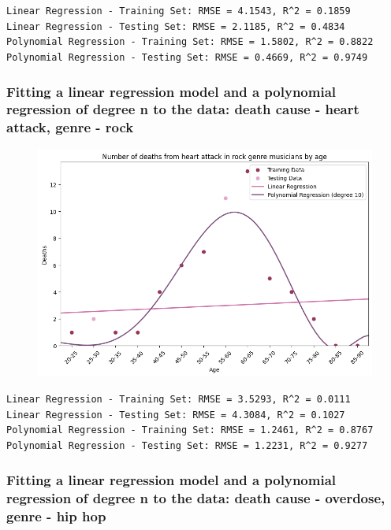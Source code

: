 \documentclass{article}
\begin{document}
\noindent\texttt{Linear Regression - Training Set: RMSE = 4.1543, R\textasciicircum2 = 0.1859\\
Linear Regression - Testing Set: RMSE = 2.1185, R\textasciicircum2 = 0.4834\\
Polynomial Regression - Training Set: RMSE = 1.5802, R\textasciicircum2 = 0.8822\\
Polynomial Regression - Testing Set: RMSE = 0.4669, R\textasciicircum2 = 0.9749\\}



\subsubsection{Fitting a linear regression model and a polynomial regression of degree n to the data: death cause - heart attack, genre - rock}

\begin{figure} [H]
    \centering
    \includegraphics[width=0.6\linewidth]{graph_images/experiments/exp2.png}
    \label{fig:enter-label}
\end{figure}

\noindent\texttt{Linear Regression - Training Set: RMSE = 3.5293, R\textasciicircum2 = 0.0111\\
Linear Regression - Testing Set: RMSE = 4.3084, R\textasciicircum2 = 0.1027\\
Polynomial Regression - Training Set: RMSE = 1.2461, R\textasciicircum2 = 0.8767\\
Polynomial Regression - Testing Set: RMSE = 1.2231, R\textasciicircum2 = 0.9277\\}



\subsubsection{Fitting a linear regression model and a polynomial regression of degree n to the data: death cause - overdose, genre - hip hop}
\end{document}
